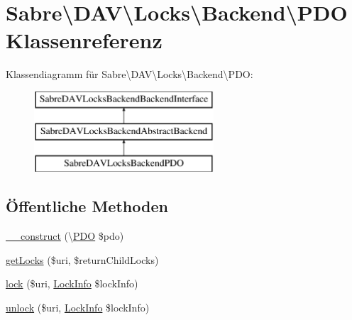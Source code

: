 \hypertarget{class_sabre_1_1_d_a_v_1_1_locks_1_1_backend_1_1_p_d_o}{}\section{Sabre\textbackslash{}D\+AV\textbackslash{}Locks\textbackslash{}Backend\textbackslash{}P\+DO Klassenreferenz}
\label{class_sabre_1_1_d_a_v_1_1_locks_1_1_backend_1_1_p_d_o}
Klassendiagramm für Sabre\textbackslash{}D\+AV\textbackslash{}Locks\textbackslash{}Backend\textbackslash{}P\+DO\+:\begin{figure}[H]
\begin{center}
\leavevmode
\includegraphics[height=3.000000cm]{class_sabre_1_1_d_a_v_1_1_locks_1_1_backend_1_1_p_d_o}
\end{center}
\end{figure}
\subsection*{Öffentliche Methoden}
\begin{DoxyCompactItemize}
\item 
\mbox{\hyperlink{class_sabre_1_1_d_a_v_1_1_locks_1_1_backend_1_1_p_d_o_a6047167851133f9f6eb8cc8176cd04db}{\+\_\+\+\_\+construct}} (\textbackslash{}\mbox{\hyperlink{class_sabre_1_1_d_a_v_1_1_locks_1_1_backend_1_1_p_d_o}{P\+DO}} \$pdo)
\item 
\mbox{\hyperlink{class_sabre_1_1_d_a_v_1_1_locks_1_1_backend_1_1_p_d_o_a990e9ac117f08b7b2f7e4fbc35fb5cd9}{get\+Locks}} (\$uri, \$return\+Child\+Locks)
\item 
\mbox{\hyperlink{class_sabre_1_1_d_a_v_1_1_locks_1_1_backend_1_1_p_d_o_a1fc812615f687620c1b7b794c3deae99}{lock}} (\$uri, \mbox{\hyperlink{class_sabre_1_1_d_a_v_1_1_locks_1_1_lock_info}{Lock\+Info}} \$lock\+Info)
\item 
\mbox{\hyperlink{class_sabre_1_1_d_a_v_1_1_locks_1_1_backend_1_1_p_d_o_a3b9fc910d8feb630c5c145597e19ed80}{unlock}} (\$uri, \mbox{\hyperlink{class_sabre_1_1_d_a_v_1_1_locks_1_1_lock_info}{Lock\+Info}} \$lock\+Info)
\end{DoxyCompactItemize}
